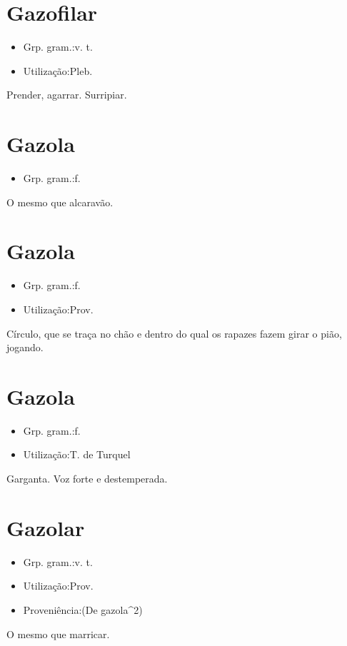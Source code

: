 \section{Gazofilar}
\begin{itemize}
\item {Grp. gram.:v. t.}
\end{itemize}
\begin{itemize}
\item {Utilização:Pleb.}
\end{itemize}
Prender, agarrar.
Surripiar.
\section{Gazola}
\begin{itemize}
\item {Grp. gram.:f.}
\end{itemize}
O mesmo que \textunderscore alcaravão\textunderscore .
\section{Gazola}
\begin{itemize}
\item {Grp. gram.:f.}
\end{itemize}
\begin{itemize}
\item {Utilização:Prov.}
\end{itemize}
Círculo, que se traça no chão e dentro do qual os rapazes fazem girar o pião, jogando.
\section{Gazola}
\begin{itemize}
\item {Grp. gram.:f.}
\end{itemize}
\begin{itemize}
\item {Utilização:T. de Turquel}
\end{itemize}
Garganta.
Voz forte e destemperada.
\section{Gazolar}
\begin{itemize}
\item {Grp. gram.:v. t.}
\end{itemize}
\begin{itemize}
\item {Utilização:Prov.}
\end{itemize}
\begin{itemize}
\item {Proveniência:(De \textunderscore gazola\textunderscore ^2)}
\end{itemize}
O mesmo que \textunderscore marricar\textunderscore .
